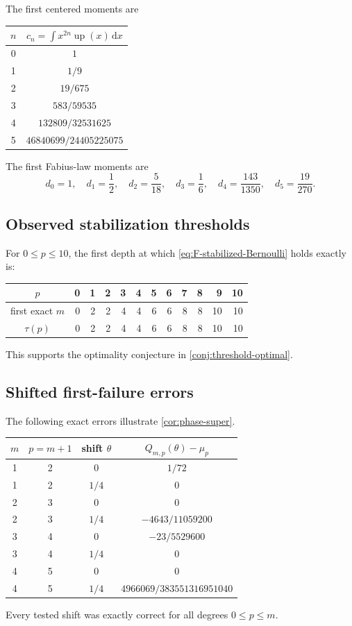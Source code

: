 \documentclass[11pt]{article}
\theoremstyle{definition}
\newcommand{\Up}{\operatorname{up}}
\newcommand{\dd}{\,\mathrm{d}}
\begin{document}
The first centered moments are
\begin{center}
\begin{tabular}{c|c}
\toprule
$n$ & $c_n=\int x^{2n}\Up(x)\dd x$\\
\midrule
0 & $1$\\
1 & $1/9$\\
2 & $19/675$\\
3 & $583/59535$\\
4 & $132809/32531625$\\
5 & $46840699/24405225075$\\
\bottomrule
\end{tabular}
\end{center}
The first Fabius-law moments are
\[
 d_0=1,\quad d_1=\frac12,\quad d_2=\frac5{18},\quad
 d_3=\frac16,\quad d_4=\frac{143}{1350},\quad
 d_5=\frac{19}{270}.
\]

\subsection{Observed stabilization thresholds}

For $0\le p\le10$, the first depth at which
\eqref{eq:F-stabilized-Bernoulli} holds exactly is:
\begin{center}
\begin{tabular}{c|rrrrrrrrrrr}
\toprule
$p$&0&1&2&3&4&5&6&7&8&9&10\\
\midrule
first exact $m$&0&2&2&4&4&6&6&8&8&10&10\\
$\tau(p)$&0&2&2&4&4&6&6&8&8&10&10\\
\bottomrule
\end{tabular}
\end{center}
This supports the optimality conjecture in \cref{conj:threshold-optimal}.

\subsection{Shifted first-failure errors}

The following exact errors illustrate \cref{cor:phase-super}.
\begin{center}
\begin{tabular}{c|c|c|c}
\toprule
$m$ & $p=m+1$ & shift $\theta$ & $Q_{m,p}(\theta)-\mu_p$\\
\midrule
1&2&$0$&$1/72$\\
1&2&$1/4$&$0$\\
2&3&$0$&$0$\\
2&3&$1/4$&$-4643/11059200$\\
3&4&$0$&$-23/5529600$\\
3&4&$1/4$&$0$\\
4&5&$0$&$0$\\
4&5&$1/4$&$4966069/383551316951040$\\
\bottomrule
\end{tabular}
\end{center}
Every tested shift was exactly correct for all degrees $0\le p\le m$.
\end{document}
